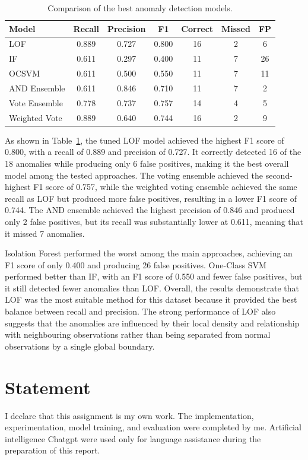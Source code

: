 \documentclass[a4paper,12pt]{article}
\begin{document}
\begin{table}
	\centering
	\small
	\setlength{\tabcolsep}{5pt}
	\caption{Comparison of the best anomaly detection models.}
	\label{tab:model_comparison}
	\begin{tabular}{lcccccc}
		\hline
		Model & Recall & Precision & F1 & Correct & Missed & FP \\
		\hline
		LOF & 0.889 & 0.727 & 0.800 & 16 & 2 & 6 \\
		IF & 0.611 & 0.297 & 0.400 & 11 & 7 & 26 \\
		OCSVM & 0.611 & 0.500 & 0.550 & 11 & 7 & 11 \\
		AND Ensemble & 0.611 & 0.846 & 0.710 & 11 & 7 & 2 \\
		Vote Ensemble & 0.778 & 0.737 & 0.757 & 14 & 4 & 5 \\
		Weighted Vote & 0.889 & 0.640 & 0.744 & 16 & 2 & 9 \\
		\hline
	\end{tabular}
\end{table}

As shown in Table~\ref{tab:model_comparison}, the tuned LOF model achieved the highest F1 score of 0.800, with a recall of 0.889 and precision of 0.727. It correctly detected 16 of the 18 anomalies while producing only 6 false positives, making it the best overall model among the tested approaches. The voting ensemble achieved the second-highest F1 score of 0.757, while the weighted voting ensemble achieved the same recall as LOF but produced more false positives, resulting in a lower F1 score of 0.744. The AND ensemble achieved the highest precision of 0.846 and produced only 2 false positives, but its recall was substantially lower at 0.611, meaning that it missed 7 anomalies.

Isolation Forest performed the worst among the main approaches, achieving an F1 score of only 0.400 and producing 26 false positives. One-Class SVM performed better than IF, with an F1 score of 0.550 and fewer false positives, but it still detected fewer anomalies than LOF. Overall, the results demonstrate that LOF was the most suitable method for this dataset because it provided the best balance between recall and precision. The strong performance of LOF also suggests that the anomalies are influenced by their local density and relationship with neighbouring observations rather than being separated from normal observations by a single global boundary.

\section{Statement}

I declare that this assignment is my own work. The implementation, experimentation, model training, and evaluation were completed by me. Artificial intelligence Chatgpt\cite{chatgpt2026} were used only for language assistance during the preparation of this report.


\end{document}
